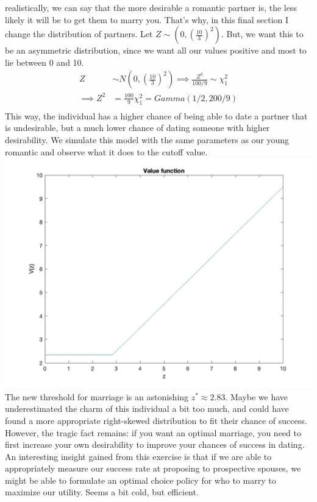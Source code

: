 \documentclass[
]{article}
\begin{document}
realistically, we can say that the more desirable a romantic partner is,
the less likely it will be to get them to marry you. That's why, in this
final section I change the distribution of partners. Let
\(Z \sim \left(0, (\frac{10}{3})^2\right)\). But, we want this to be an
asymmetric distribution, since we want all our values positive and most
to lie between 0 and 10. \[\begin{aligned} 
Z &\sim N\left(0, (\frac{10}{3})^2\right)  \implies \frac{Z^2}{100 / 9} \sim \chi^2_1 \\
\implies Z^2 &= \frac{100}{9}\chi^2_1 = Gamma(1/2, 200 / 9)\\
\end{aligned}\] This way, the individual has a higher chance of being
able to date a partner that is undesirable, but a much lower chance of
dating someone with higher desirability. We simulate this model with the
same parameters as our young romantic and observe what it does to the
cutoff value.\\
\includegraphics{images/realisticdating.jpg} The new threshold for
marriage is an astonishing \(z^* \approx 2.83\). Maybe we have
underestimated the charm of this individual a bit too much, and could
have found a more appropriate right-skewed distribution to fit their
chance of success. However, the tragic fact remains: if you want an
optimal marriage, you need to first increase your own desirability to
improve your chances of success in dating.\\
An interesting insight gained from this exercise is that if we are able
to appropriately measure our success rate at proposing to prospective
spouses, we might be able to formulate an optimal choice policy for who
to marry to maximize our utility. Seems a bit cold, but efficient.
\end{document}
